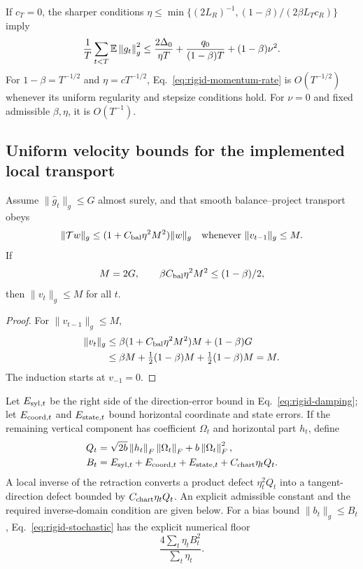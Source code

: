 \begin{corollary}
If $c_T=0$, the sharper conditions
$\eta\leq\min\{(2L_R)^{-1},(1-\beta)/(2\beta L_Tc_R)\}$ imply
\begin{equation}
\frac1T\sum_{t<T}\mathbb E\left\lVert g_t\right\rVert_g^2
\leq\frac{2\Delta_0}{\eta T}
+\frac{q_0}{(1-\beta)T}+(1-\beta)\nu^2 .
\end{equation}
For $1-\beta=T^{-1/2}$ and $\eta=cT^{-1/2}$,
Eq.~\eqref{eq:rigid-momentum-rate} is $O(T^{-1/2})$ whenever its
uniform regularity and stepsize conditions hold. For $\nu=0$ and
fixed admissible $\beta,\eta$, it is $O(T^{-1})$.
\end{corollary}

\subsection{Uniform velocity bounds for the implemented local transport}
\begin{proposition}
Assume $\|\widehat g_t\|_g\leq G$ almost surely, and that smooth
balance--project transport obeys
\begin{equation}
\|\mathcal T w\|_g\leq(1+C_{\rm bal}\eta^2M^2)\|w\|_g
\quad\text{whenever }\|v_{t-1}\|_g\leq M.
\end{equation}
If
\begin{equation}
M=2G,\qquad
\beta C_{\rm bal}\eta^2M^2\leq(1-\beta)/2,
\end{equation}
then $\|v_t\|_g\leq M$ for all $t$.
\end{proposition}
\begin{proof}
For $\|v_{t-1}\|_g\leq M$,
\begin{align}
\|v_t\|_g
&\leq\beta(1+C_{\rm bal}\eta^2M^2)M+(1-\beta)G\\
&\leq\beta M+\tfrac12(1-\beta)M
+\tfrac12(1-\beta)M=M .
\end{align}
The induction starts at $v_{-1}=0$.
\end{proof}

\begin{proposition}
Let $E_{{\rm syl},t}$ be the right side of the direction-error bound
in Eq.~\eqref{eq:rigid-damping}; let $E_{{\rm coord},t}$ and
$E_{{\rm state},t}$ bound horizontal coordinate and state errors.
If the remaining vertical component has coefficient $\Omega_t$
and horizontal part $h_t$, define
\begin{align}
Q_t&=\sqrt{2b}\left\lVert h_t\right\rVert_F\left\lVert\Omega_t\right\rVert_F+b\left\lVert\Omega_t\right\rVert_F^2,\\
B_t&=E_{{\rm syl},t}+E_{{\rm coord},t}
+E_{{\rm state},t}+C_{\rm chart}\eta_tQ_t .
\end{align}
A local inverse of the retraction converts a product defect
$\eta_t^2Q_t$ into a tangent-direction defect bounded by
$C_{\rm chart}\eta_tQ_t$. An explicit admissible constant and
the required inverse-domain condition are given below.
For a bias bound $\|b_t\|_g\leq B_t$, Eq.~\eqref{eq:rigid-stochastic}
has the explicit numerical floor
\begin{equation}
\frac{4\sum_t\eta_tB_t^2}{\sum_t\eta_t}.
\end{equation}
\end{proposition}

